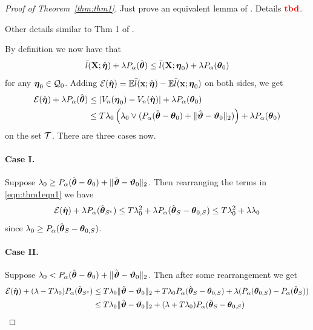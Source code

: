 \documentclass[11pt,letterpaper]{article}
\DeclareMathOperator*{\rtbd}{{\colrbf tbd}}
\numberwithin{equation}{section}
\begin{document}
\begin{proof}[Proof of Theorem~\ref{thm:thm1}]
Just prove an equivalent lemma of \cite{StadlerEtal10}. Details $\rtbd$.

Other details similar to Thm 1 of \cite{StadlerEtal10}.

By definition we now have that
$$
\bar l({\mathbf{X}}; \hat {{\boldsymbol{\eta}}}) + \lambda P_\alpha (\hat {{\boldsymbol{\theta}}}) \leq
\bar l({\mathbf{X}}; {\boldsymbol{\eta}}_0) + \lambda P_\alpha ({\boldsymbol{\theta}}_0)
$$
%
for any ${\boldsymbol{\eta}}_0 \in {\cal{Q}}_0$. Adding ${\cal{E}}(\hat {{\boldsymbol{\eta}}}) = {\mathbb{E}} \bar l({\bf{x}}; \hat {{\boldsymbol{\eta}}}) - {\mathbb{E}} \bar l({\bf{x}}; {\boldsymbol{\eta}}_0)$ on both sides, we get
%
\begin{align}
{\cal{E}}(\hat {{\boldsymbol{\eta}}}) + \lambda P_\alpha (\hat {{\boldsymbol{\theta}}}) & \leq
|V_n({\boldsymbol{\eta}}_0) - V_n(\hat {{\boldsymbol{\eta}}})| + \lambda P_\alpha ({\boldsymbol{\theta}}_0) \notag \\
& \leq T \lambda_0 \left( \lambda_0 \vee (P_\alpha (\hat {{\boldsymbol{\theta}}} - {\boldsymbol{\theta}}_0 ) +
\| \hat {{\boldsymbol{\vartheta}}} - {\boldsymbol{\vartheta}}_0 \|_2) \right) + \lambda P_\alpha ({\boldsymbol{\theta}}_0) \label{eqn:thm1eqn1}
\end{align}
%
on the set ${\cal{T}}$. There are three cases now.

\paragraph{Case I.} Suppose $\lambda_0 \geq P_\alpha (\hat {{\boldsymbol{\theta}}} - {\boldsymbol{\theta}}_0) + \| \hat {{\boldsymbol{\vartheta}}} - {\boldsymbol{\vartheta}}_0 \|_2$. Then rearranging the terms in \eqref{eqn:thm1eqn1} we have
%
$$
{\cal{E}}(\hat {{\boldsymbol{\eta}}}) + \lambda P_\alpha (\hat {{\boldsymbol{\theta}}}_{S^c}) \leq
T \lambda_0^2 + \lambda P_\alpha (\hat {{\boldsymbol{\theta}}}_S - {\boldsymbol{\theta}}_{0,S} )
\leq T \lambda_0^2 + \lambda \lambda_0
$$
%
since $\lambda_0 \geq P_\alpha (\hat {{\boldsymbol{\theta}}}_S - {\boldsymbol{\theta}}_{0,S} )$.

\paragraph{Case II.} Suppose $\lambda_0 < P_\alpha (\hat {{\boldsymbol{\theta}}} - {\boldsymbol{\theta}}_0) + \| \hat {{\boldsymbol{\vartheta}}} - {\boldsymbol{\vartheta}}_0 \|_2$. Then after some rearrangement we get
%
\begin{align*}
{\cal{E}}(\hat {{\boldsymbol{\eta}}}) + (\lambda - T\lambda_0) P_\alpha (\hat {{\boldsymbol{\theta}}}_{S^c}) & \leq
T\lambda_0 \| \hat {{\boldsymbol{\vartheta}}} - {\boldsymbol{\vartheta}}_0 \|_2 + T\lambda_0 P_\alpha (\hat {{\boldsymbol{\theta}}}_S - {\boldsymbol{\theta}}_{0,S} ) +
\lambda (P_\alpha ({\boldsymbol{\theta}}_{0,S}) - P_\alpha (\hat {{\boldsymbol{\theta}}}_S))\\
& \leq T\lambda_0 \| \hat {{\boldsymbol{\vartheta}}} - {\boldsymbol{\vartheta}}_0 \|_2 + (\lambda + T \lambda_0) P_\alpha (\hat {{\boldsymbol{\theta}}}_S - {\boldsymbol{\theta}}_{0,S} )
\end{align*}
\end{proof}
\end{document}
